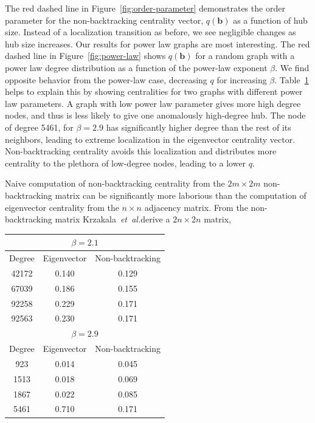 \documentclass[twocolumn,prl,superscriptaddress]{revtex4}
\newcommand{\etal}{{\it{}et~al.}}
\renewcommand{\vec}{\mathbf}
\begin{document}
The red dashed line in Figure~\ref{fig:order-parameter} demonstrates the order parameter for the non-backtracking centrality vector, $q(\vec{b})$ as a function of hub size. Instead of a localization transition as before, we see negligible changes as hub size increases. Our results for power law graphs are most interesting. The red dashed line in Figure~\ref{fig:power-law} shows $q(\vec{b})$ for a random graph with a power law degree distribution as a function of the power-law exponent $\beta$. We find opposite behavior from the power-law case, decreasing $q$ for increasing $\beta$. Table~\ref{tab:power} helps to explain this by showing centralities for two graphs with different power law parameters. A graph with low power law parameter gives more high degree nodes, and thus is less likely to give one anomalously high-degree hub. The node of degree 5461, for $\beta = 2.9$ has significantly higher degree than the rest of its neighbors, leading to extreme localization in the eigenvector centrality vector. Non-backtracking centrality avoids this localization and distributes more centrality to the plethora of low-degree nodes, leading to a lower $q$.

Naive computation of non-backtracking centrality from the $2m \times 2m$ non-backtracking matrix can be significantly more laborious than the computation of eigenvector centrality from the $n \times n$ adjacency matrix. From the non-backtracking matrix Krzakala~\etal derive a $2n \times 2n$ matrix, %

\begin{table}
\centering
\begin{tabular}{|c|c|c|} \hline
\multicolumn{3}{|c|}{$\beta=2.1$} \\ \hline
Degree & Eigenvector & Non-backtracking \\ \hline
42172 & 0.140 & 0.129 \\ \hline
67039 & 0.186 & 0.155 \\ \hline
92258 & 0.229 & 0.171 \\ \hline
92563 & 0.230 & 0.171 \\ \hline \hline
\multicolumn{3}{|c|}{$\beta=2.9$} \\ \hline 
Degree & Eigenvector & Non-backtracking \\ \hline
923  & 0.014 & 0.045 \\ \hline
1513 & 0.018 & 0.069 \\ \hline
1867 & 0.022 & 0.085 \\ \hline
5461 & 0.710 & 0.171 \\ \hline
\end{tabular}
\label{tab:power}
\end{table}
\end{document}
